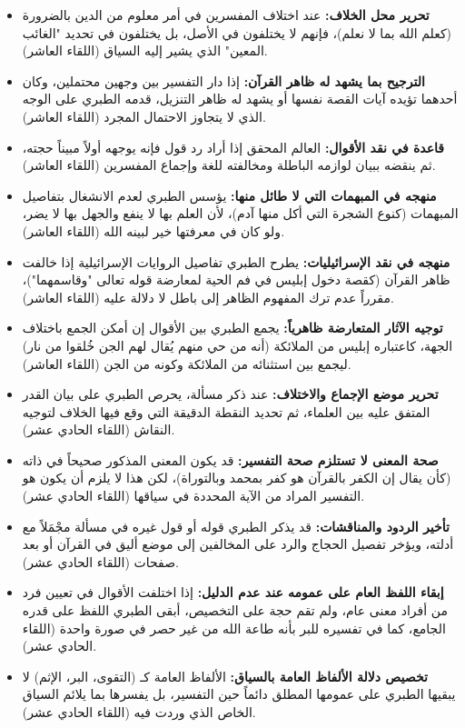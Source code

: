 \begin{itemize}
    \item \textbf{تحرير محل الخلاف:} عند اختلاف المفسرين في أمر معلوم من الدين بالضرورة (كعلم الله بما لا نعلم)، فإنهم لا يختلفون في الأصل، بل يختلفون في تحديد "الغائب المعين" الذي يشير إليه السياق (اللقاء العاشر).
    \item \textbf{الترجيح بما يشهد له ظاهر القرآن:} إذا دار التفسير بين وجهين محتملين، وكان أحدهما تؤيده آيات القصة نفسها أو يشهد له ظاهر التنزيل، قدمه الطبري على الوجه الذي لا يتجاوز الاحتمال المجرد (اللقاء العاشر).
    \item \textbf{قاعدة في نقد الأقوال:} العالم المحقق إذا أراد رد قول فإنه يوجهه أولاً مبيناً حجته، ثم ينقضه ببيان لوازمه الباطلة ومخالفته للغة وإجماع المفسرين (اللقاء العاشر).
    \item \textbf{منهجه في المبهمات التي لا طائل منها:} يؤسس الطبري لعدم الانشغال بتفاصيل المبهمات (كنوع الشجرة التي أكل منها آدم)، لأن العلم بها لا ينفع والجهل بها لا يضر، ولو كان في معرفتها خير لبينه الله (اللقاء العاشر).
    \item \textbf{منهجه في نقد الإسرائيليات:} يطرح الطبري تفاصيل الروايات الإسرائيلية إذا خالفت ظاهر القرآن (كقصة دخول إبليس في فم الحية لمعارضة قوله تعالى "وقاسمهما")، مقرراً عدم ترك المفهوم الظاهر إلى باطل لا دلالة عليه (اللقاء العاشر).
    \item \textbf{توجيه الآثار المتعارضة ظاهرياً:} يجمع الطبري بين الأقوال إن أمكن الجمع باختلاف الجهة، كاعتباره إبليس من الملائكة (أنه من حي منهم يُقال لهم الجن خُلقوا من نار) ليجمع بين استثنائه من الملائكة وكونه من الجن (اللقاء العاشر).
    \item \textbf{تحرير موضع الإجماع والاختلاف:} عند ذكر مسألة، يحرص الطبري على بيان القدر المتفق عليه بين العلماء، ثم تحديد النقطة الدقيقة التي وقع فيها الخلاف لتوجيه النقاش (اللقاء الحادي عشر).
    \item \textbf{صحة المعنى لا تستلزم صحة التفسير:} قد يكون المعنى المذكور صحيحاً في ذاته (كأن يقال إن الكفر بالقرآن هو كفر بمحمد وبالتوراة)، لكن هذا لا يلزم أن يكون هو التفسير المراد من الآية المحددة في سياقها (اللقاء الحادي عشر).
    \item \textbf{تأخير الردود والمناقشات:} قد يذكر الطبري قوله أو قول غيره في مسألة مجْمَلاً مع أدلته، ويؤخر تفصيل الحجاج والرد على المخالفين إلى موضع أليق في القرآن أو بعد صفحات (اللقاء الحادي عشر).
    \item \textbf{إبقاء اللفظ العام على عمومه عند عدم الدليل:} إذا اختلفت الأقوال في تعيين فرد من أفراد معنى عام، ولم تقم حجة على التخصيص، أبقى الطبري اللفظ على قدره الجامع، كما في تفسيره للبر بأنه طاعة الله من غير حصر في صورة واحدة (اللقاء الحادي عشر).
    \item \textbf{تخصيص دلالة الألفاظ العامة بالسياق:} الألفاظ العامة كـ (التقوى، البر، الإثم) لا يبقيها الطبري على عمومها المطلق دائماً حين التفسير، بل يفسرها بما يلائم السياق الخاص الذي وردت فيه (اللقاء الحادي عشر).

\end{itemize}
